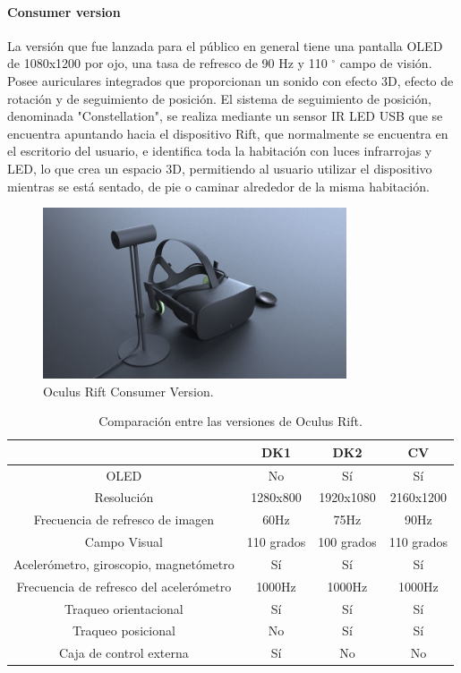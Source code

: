 \documentclass[12pt]{article}
\begin{document}
\paragraph{Consumer version}
La versión que fue lanzada para el público en general tiene una pantalla OLED de 1080x1200 por ojo, una tasa de refresco de 90 Hz y 110 $^{\circ}$ campo de visión. Posee auriculares integrados que proporcionan un sonido con efecto 3D, efecto de rotación y de seguimiento de posición. El sistema de seguimiento de posición, denominada "Constellation", se realiza mediante un sensor IR LED USB que se encuentra apuntando hacia el dispositivo Rift, que normalmente se encuentra en el escritorio del usuario, e identifica toda la habitación con luces infrarrojas y LED, lo que crea un espacio 3D, permitiendo al usuario utilizar el dispositivo mientras se está sentado, de pie o caminar alrededor de la misma habitación. 
\begin{figure}[h!]
\includegraphics[width=0.8\textwidth,center]{cv.jpg}
\caption{Oculus Rift Consumer Version.}
\end{figure}
\begin{table}[h!]
  \centering
  \label{tab:table1}
  \begin{tabular}{cccc}
    \toprule
     & DK1 & DK2 & CV\\
    \midrule
    OLED & No & Sí & Sí\\
    Resolución & 1280x800 & 1920x1080 & 2160x1200 \\
    Frecuencia de refresco de imagen & 60Hz & 75Hz & 90Hz\\
    Campo Visual & 110 grados & 100 grados & 110 grados\\
    Acelerómetro, giroscopio, magnetómetro & Sí & Sí & Sí\\  
    Frecuencia de refresco del acelerómetro & 1000Hz& 1000Hz & 1000Hz\\
    Traqueo orientacional & Sí & Sí & Sí\\ 
    Traqueo posicional & No & Sí & Sí\\
    Caja de control externa & Sí & No & No\\
    \bottomrule
  \end{tabular}
  \caption{Comparación entre las versiones de Oculus Rift.}
\end{table}
\clearpage
\end{document}

